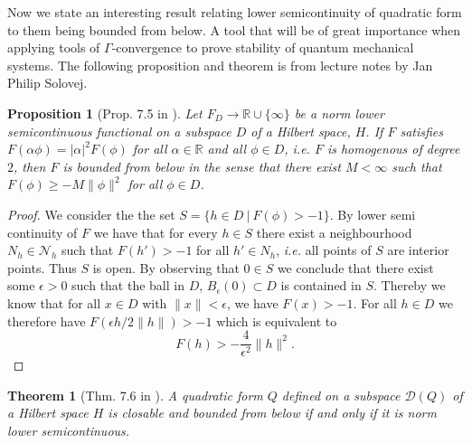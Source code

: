 \documentclass[a4paper,11pt]{article}
\newcommand{\dom}[1]{\mathscr D\left(#1\right)}
\newcommand{\ie}{\emph{i.e.} }
\newcommand{\R}{\mathbb{R}}
\newtheorem{theorem}{Theorem}
\newtheorem{proposition}{Proposition}
\numberwithin{equation}{section}
\begin{document}
Now we state an interesting result relating lower semicontinuity of quadratic form to them being bounded from below. A tool that will be of great importance when applying tools of $ \Gamma $-convergence to prove stability of quantum mechanical systems. The following proposition and theorem is from lecture notes by Jan Philip Solovej.
\begin{proposition}[Prop. 7.5 in \cite{JPS_lecturenotes}] \label{Norm low.sem.cont bounded from below prop.}
	Let $ F_D\to \R\cup\{\infty\} $ be a norm lower semicontinuous functional on a subspace $ D $ of a Hilbert space, $ H $. If $ F $ satisfies $ F(\alpha\phi)=|\alpha|^2F(\phi) $ for all $ \alpha\in\R $ and all $ \phi\in D $, \ie $ F $ is homogenous of degree $ 2 $, then $ F $ is bounded from below in the sense that there exist $ M<\infty $ such that $ F(\phi)\geq-M\|\phi\|^2 $ for all $ \phi\in D $.
\end{proposition}
\begin{proof}
	We consider the the set $ S=\{h\in D\ |\ F(\phi)>-1 \} $. By lower semi continuity of $ F $ we have that for every $ h\in S $ there exist a neighbourhood $ N_h\in\mathcal{N}_h $ such that $ F(h')>-1 $ for all $ h'\in N_h $, \ie all points of $ S $ are interior points. Thus $ S $ is open. By observing that $ 0\in S $ we conclude that there exist some $ \epsilon>0 $ such that the ball in $ D $, $ B_\epsilon(0)\subset D $ is contained in $ S $. Thereby we know that for all $ x\in D $ with $ \|x\|<\epsilon $, we have $ F(x)>-1 $. For all $ h\in D $ we therefore have 
	$ F(\epsilon h/2\|h\|)>-1 $ which is equivalent to \begin{equation}
	F(h)>-\frac{4}{\epsilon^2}\|h\|^2.
	\end{equation}
\end{proof}
\begin{theorem}[Thm. 7.6 in \cite{JPS_lecturenotes}]\label{Quadratic form closable and bounded below iff low.semicont. Thm.}
	A quadratic form $ Q $ defined on a subspace $ \dom{Q} $ of a Hilbert space $ H $ is closable and bounded from below if and only if it is norm lower semicontinuous.
\end{theorem}
\end{document}
